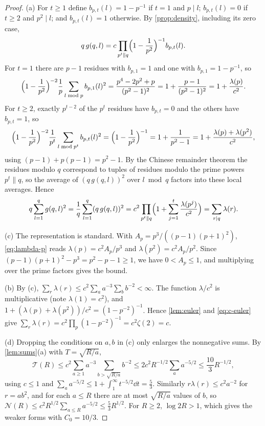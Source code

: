 \begin{proof}
(a) For $t\ge1$ define $b_{p,t}(l)=1-p^{-1}$ if $t=1$ and $p\mid l$; $b_{p,t}(l)=0$ if $t\ge2$ and $p^2\mid l$; and $b_{p,t}(l)=1$ otherwise. By \cref{prop:density}, including its zero case,
\[
q\,g(q,l)=c\prod_{p^t\parallel q}\Bigl(1-\frac1{p^2}\Bigr)^{-1}b_{p,t}(l).
\]
For $t=1$ there are $p-1$ residues with $b_{p,1}=1$ and one with $b_{p,1}=1-p^{-1}$, so
\[
\Bigl(1-\frac1{p^2}\Bigr)^{-2}\frac1p\sum_{l\bmod p}b_{p,1}(l)^2=\frac{p^4-2p^2+p}{(p^2-1)^2}=1+\frac{p-1}{(p^2-1)^2}=1+\frac{\lambda(p)}{c^2}.
\]
For $t\ge2$, exactly $p^{t-2}$ of the $p^t$ residues have $b_{p,t}=0$ and the others have $b_{p,t}=1$, so
\[
\Bigl(1-\frac1{p^2}\Bigr)^{-2}\frac1{p^t}\sum_{l\bmod p^t}b_{p,t}(l)^2=\Bigl(1-\frac1{p^2}\Bigr)^{-1}=1+\frac1{p^2-1}=1+\frac{\lambda(p)+\lambda(p^2)}{c^2},
\]
using $(p-1)+p(p-1)=p^2-1$. By the Chinese remainder theorem the residues modulo $q$ correspond to tuples of residues modulo the prime powers $p^t\parallel q$, so the average of $(q\,g(q,l))^2$ over $l\bmod q$ factors into these local averages. Hence
\[
q\sum_{l=1}^qg(q,l)^2=\frac1q\sum_{l=1}^q(q\,g(q,l))^2=c^2\prod_{p^t\parallel q}\Bigl(1+\sum_{j=1}^{t}\frac{\lambda(p^j)}{c^2}\Bigr)=\sum_{r\mid q}\lambda(r).
\]

(c) The representation is standard. With $A_p=p^3/((p-1)(p+1)^2)$, \eqref{eq:lambda-p} reads $\lambda(p)=c^2A_p/p^3$ and $\lambda(p^2)=c^2A_p/p^2$. Since $(p-1)(p+1)^2-p^3=p^2-p-1\ge1$, we have $0<A_p\le1$, and multiplying over the prime factors gives the bound.

(b) By (c), $\sum_r\lambda(r)\le c^2\sum_aa^{-3}\sum_bb^{-2}<\infty$. The function $\lambda/c^2$ is multiplicative (note $\lambda(1)=c^2$), and $1+(\lambda(p)+\lambda(p^2))/c^2=(1-p^{-2})^{-1}$. Hence \cref{lem:euler} and \eqref{eq:c-euler} give $\sum_r\lambda(r)=c^2\prod_p(1-p^{-2})^{-1}=c^2\zeta(2)=c$.

(d) Dropping the conditions on $a,b$ in (c) only enlarges the nonnegative sums. By \cref{lem:sums}(a) with $T=\sqrt{R/a}$,
\[
\mathcal T(R)\le c^2\sum_{a\ge1}a^{-3}\sum_{b>\sqrt{R/a}}b^{-2}\le2c^2R^{-1/2}\sum_aa^{-5/2}\le\frac{10}3R^{-1/2},
\]
using $c\le1$ and $\sum_aa^{-5/2}\le1+\int_1^\infty t^{-5/2}\dd t=\frac53$. Similarly $r\lambda(r)\le c^2a^{-2}$ for $r=ab^2$, and for each $a\le R$ there are at most $\sqrt{R/a}$ values of $b$, so $\mathcal N(R)\le c^2R^{1/2}\sum_{a\le R}a^{-5/2}\le\frac53R^{1/2}$. For $R\ge2$, $\log 2R>1$, which gives the weaker forms with $C_0=10/3$.
\end{proof}

